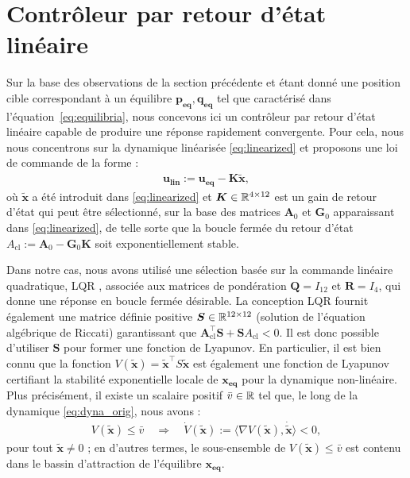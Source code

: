 \section{Contrôleur par retour d'état linéaire}
\label{sec:ctrlLin}
Sur la base des observations de la section précédente et étant donné une position cible correspondant à un équilibre $\boldsymbol{p_{\text{eq}}}, \boldsymbol{q_{\text{eq}}}$ tel que caractérisé dans l'équation~\ref{eq:equilibria}, nous concevons ici un contrôleur par retour d'état linéaire capable de produire une réponse rapidement convergente. Pour cela, nous nous concentrons sur la dynamique linéarisée \eqref{eq:linearized} et proposons une loi de commande de la forme :
\begin{align}
  \boldsymbol{u_{\text{lin}}} := \boldsymbol{u_{\text{eq}}} - \boldsymbol{K} \boldsymbol{\tilde x},
\label{eq:u_lin}
\end{align}
où $\boldsymbol{\tilde x}$ a été introduit dans \eqref{eq:linearized} et $\boldsymbol{K} \in {\mathbb R}^{4 \times 12}$ est un gain de retour d'état qui peut être sélectionné, sur la base des matrices $\boldsymbol{A}_{0}$ et $\boldsymbol{G}_{0}$ apparaissant dans \eqref{eq:linearized}, de telle sorte que la boucle fermée du retour d'état $A_{\text{cl}}:=\boldsymbol{A}_{0}-\boldsymbol{G}_{0}\boldsymbol{K}$ soit exponentiellement stable. 

Dans notre cas, nous avons utilisé une sélection basée sur la commande linéaire quadratique, LQR , associée aux matrices de pondération $\boldsymbol{Q} = I_{12}$ et $\boldsymbol{R} = I_{4}$, qui donne une réponse en boucle fermée désirable. La conception LQR fournit également une matrice définie positive  $\boldsymbol{S} \in {\mathbb R}^{12 \times 12}$ (solution de l'équation algébrique de Riccati) garantissant que $\boldsymbol{A}_{\text{cl}}^\top \boldsymbol{S} + \boldsymbol{S} A_{\text{cl}} <0$. Il est donc possible d'utiliser $\boldsymbol{S}$ pour former une fonction de Lyapunov.  En particulier, il est bien connu que la fonction $V(\boldsymbol{\tilde x}) = \boldsymbol{\tilde x}^\top S \boldsymbol{\tilde x}$ est également une fonction de Lyapunov certifiant la stabilité exponentielle locale de $\boldsymbol{x_{\text{eq}}}$ pour la dynamique non-linéaire. Plus précisément, il existe un scalaire positif $\bar v \in {\mathbb R}$ tel que, le long de la dynamique \eqref{eq:dyna_orig}, nous avons :
\begin{align}
\label{eq:Vdecrease}
  V(\boldsymbol{\tilde x}) \leq \bar v \quad \Rightarrow \quad \dot V(\boldsymbol{\tilde x}) := \langle 
\nabla V(\boldsymbol{\tilde x}), \boldsymbol{\dot{\tilde x}}\rangle <0,
\end{align}
pour tout $\boldsymbol{\tilde x} \neq 0$ ; en d'autres termes, le sous-ensemble de $V(\boldsymbol{\tilde x}) \leq \bar v$ est contenu dans le bassin d'attraction de l'équilibre $\boldsymbol{x_{\text{eq}}}$.

